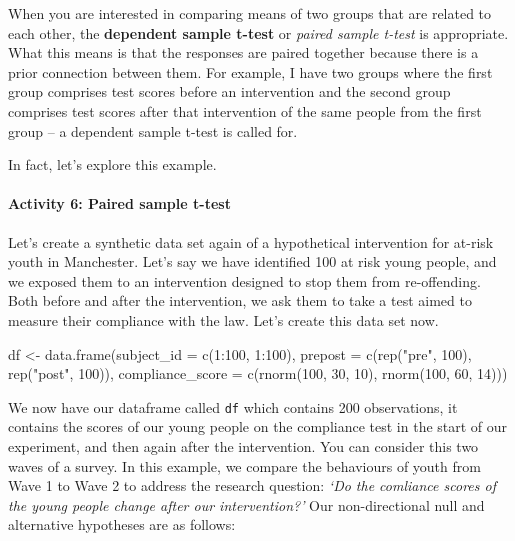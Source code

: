 \documentclass[
]{book}
\newenvironment{Shaded}{\begin{snugshade}}{\end{snugshade}}
\newcommand{\AttributeTok}[1]{\textcolor[rgb]{0.77,0.63,0.00}{#1}}
\newcommand{\DecValTok}[1]{\textcolor[rgb]{0.00,0.00,0.81}{#1}}
\newcommand{\FunctionTok}[1]{\textcolor[rgb]{0.00,0.00,0.00}{#1}}
\newcommand{\NormalTok}[1]{#1}
\newcommand{\OtherTok}[1]{\textcolor[rgb]{0.56,0.35,0.01}{#1}}
\newcommand{\SpecialCharTok}[1]{\textcolor[rgb]{0.00,0.00,0.00}{#1}}
\newcommand{\StringTok}[1]{\textcolor[rgb]{0.31,0.60,0.02}{#1}}
\begin{document}
When you are interested in comparing means of two groups that are related to each other, the \textbf{dependent sample t-test} or \emph{paired sample t-test} is appropriate. What this means is that the responses are paired together because there is a prior connection between them. For example, I have two groups where the first group comprises test scores before an intervention and the second group comprises test scores after that intervention of the same people from the first group -- a dependent sample t-test is called for.

In fact, let's explore this example.

\hypertarget{activity-6-paired-sample-t-test}{%
\paragraph{Activity 6: Paired sample t-test}\label{activity-6-paired-sample-t-test}}

Let's create a synthetic data set again of a hypothetical intervention for at-risk youth in Manchester. Let's say we have identified 100 at risk young people, and we exposed them to an intervention designed to stop them from re-offending. Both before and after the intervention, we ask them to take a test aimed to measure their compliance with the law. Let's create this data set now.

\begin{Shaded}
\begin{Highlighting}[]
\NormalTok{df }\OtherTok{\textless{}{-}} \FunctionTok{data.frame}\NormalTok{(}\AttributeTok{subject\_id =} \FunctionTok{c}\NormalTok{(}\DecValTok{1}\SpecialCharTok{:}\DecValTok{100}\NormalTok{, }\DecValTok{1}\SpecialCharTok{:}\DecValTok{100}\NormalTok{), }
                 \AttributeTok{prepost =} \FunctionTok{c}\NormalTok{(}\FunctionTok{rep}\NormalTok{(}\StringTok{"pre"}\NormalTok{, }\DecValTok{100}\NormalTok{), }\FunctionTok{rep}\NormalTok{(}\StringTok{"post"}\NormalTok{, }\DecValTok{100}\NormalTok{)),}
                 \AttributeTok{compliance\_score =} \FunctionTok{c}\NormalTok{(}\FunctionTok{rnorm}\NormalTok{(}\DecValTok{100}\NormalTok{, }\DecValTok{30}\NormalTok{, }\DecValTok{10}\NormalTok{), }\FunctionTok{rnorm}\NormalTok{(}\DecValTok{100}\NormalTok{, }\DecValTok{60}\NormalTok{, }\DecValTok{14}\NormalTok{)))}
\end{Highlighting}
\end{Shaded}

We now have our dataframe called \texttt{df} which contains 200 observations, it contains the scores of our young people on the compliance test in the start of our experiment, and then again after the intervention. You can consider this two waves of a survey. In this example, we compare the behaviours of youth from Wave 1 to Wave 2 to address the research question: \emph{`Do the comliance scores of the young people change after our intervention?'} Our non-directional null and alternative hypotheses are as follows:
\end{document}
